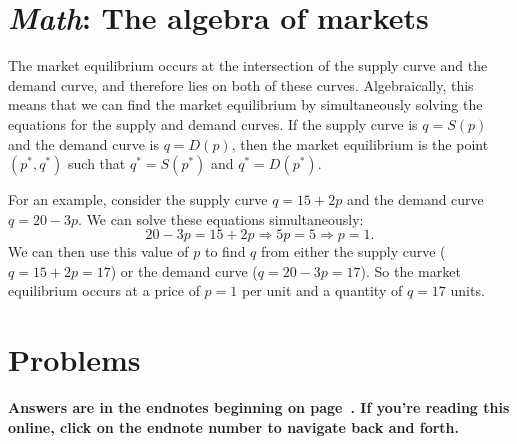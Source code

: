 \section{\emph{Math}: The algebra of markets}

The market equilibrium occurs at the intersection of the supply curve and the demand curve, and therefore lies on both of these curves. Algebraically, this means that we can find the market equilibrium by simultaneously solving the equations for the supply and demand curves. If the supply curve is $q=S(p)$ and the demand curve is $q=D(p)$, then the market equilibrium is the point $(p^*, q^*)$ such that $q^*=S(p^*)$ and $q^*=D(p^*)$.

For an example, consider the supply curve $q=15+2p$ and the demand curve $q=20-3p$. We can solve these equations simultaneously:
\[
20-3p=15+2p\Longrightarrow
5p=5\Longrightarrow p=1.
\]
We can then use this value of $p$ to find $q$ from either the supply curve ($q=15+2p=17$) or the demand curve ($q=20-3p=17$). So the market equilibrium occurs at a price of $p=1$ per unit and a quantity of $q=17$ units.


%
%
%
%
%


\bigskip
\bigskip
\section*{Problems}

\noindent \textbf{Answers are in the endnotes beginning on page~\pageref{3basicsa}. If you're reading this online, click on the endnote number to navigate back and forth.}



